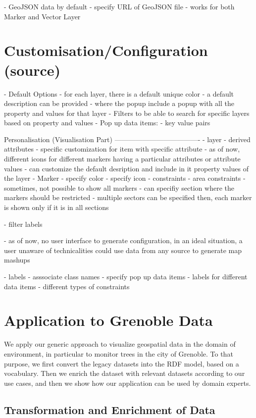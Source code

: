 \documentclass[a4paper,pagenum,english]{rnti}
\begin{document}
{	- GeoJSON data by default
		- specify URL of GeoJSON file
		- works for both Marker and Vector Layer


\section{Customisation/Configuration (source)}\label{section:customisation}
- Default Options
	- for each layer, there is a default unique color
	- a default description can be provided
		- where the popup include a popup with all the property and values for that layer
	- Filters to be able to search for specific layers based on property and values
- Pop up data items:
	- key value pairs
	
	
Personalisation (Visualisation Part)
-------------------------------------
	- layer
		- derived attributes
		- specific customization for item with specific attribute
			- as of now, different icons for different markers having a particular attributes or attribute values
		- can customize the default desription and include in it property values of the layer
	- Marker
		- specify color
		- specify icon
	- constraints
		- area constraints
			- sometimes, not possible to show all markers
			- can specifiy section where the markers should be restricted
			- multiple sectors can be specified then, each marker is shown only if it is in all sections

	- filter labels

- as of now, no user interface to generate configuration, in an ideal situation, a user unaware of technicalities could use data from any source to generate map mashups


- labels 
- asssociate class names
- specify pop up data items
	- labels for different data items
- different types of constraints


\section{Application to Grenoble Data}\label{section:customisation}
We apply our generic approach to visualize geospatial data in the domain of environment, in particular to monitor trees in the city of Grenoble. To that purpose, we first convert the legacy datasets into the RDF model, based on a vocabulary. Then we enrich the dataset with relevant datasets according to our use cases, and then we show how our application can be used by domain experts.

\subsection{Transformation and Enrichment of Data}

}
\end{document}
